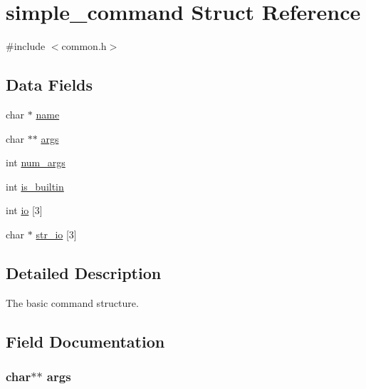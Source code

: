 \hypertarget{structsimple__command}{}\section{simple\+\_\+command Struct Reference}
\label{structsimple__command}


{\ttfamily \#include $<$common.\+h$>$}

\subsection*{Data Fields}
\begin{DoxyCompactItemize}
\item 
char $\ast$ \hyperlink{structsimple__command_a5ac083a645d964373f022d03df4849c8}{name}
\item 
char $\ast$$\ast$ \hyperlink{structsimple__command_aa24f72e6a4d6a997528142211b375496}{args}
\item 
int \hyperlink{structsimple__command_ac4e44ff521d44260ba0133a28b2b9a79}{num\+\_\+args}
\item 
int \hyperlink{structsimple__command_a911dcab49b8e851dbaea397e4484a899}{is\+\_\+builtin}
\item 
int \hyperlink{structsimple__command_a5fc7b270e96f791a5dfc2d6fc660746f}{io} \mbox{[}3\mbox{]}
\item 
char $\ast$ \hyperlink{structsimple__command_addb37712c399c7c94b8a7ec8cf392d39}{str\+\_\+io} \mbox{[}3\mbox{]}
\end{DoxyCompactItemize}


\subsection{Detailed Description}
The basic command structure. 

\subsection{Field Documentation}
\subsubsection[{\texorpdfstring{args}{args}}]{\setlength{\rightskip}{0pt plus 5cm}char$\ast$$\ast$ args}\hypertarget{structsimple__command_aa24f72e6a4d6a997528142211b375496}{}\label{structsimple__command_aa24f72e6a4d6a997528142211b375496}
